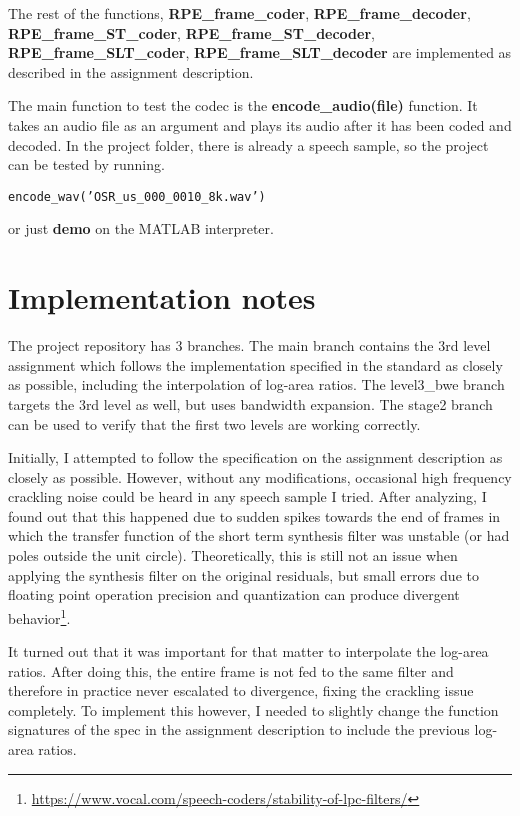 \documentclass[]{article}
\begin{document}
The rest of the functions, \textbf{RPE\_frame\_coder}, \textbf{RPE\_frame\_decoder}, \\ \textbf{RPE\_frame\_ST\_coder}, \textbf{RPE\_frame\_ST\_decoder}, \textbf{RPE\_frame\_SLT\_coder}, \textbf{RPE\_frame\_SLT\_decoder} are implemented as described in the assignment description.

The main function to test the codec is the \textbf{encode\_audio(file)} function. It takes an audio file as an argument and plays its audio after it has been coded and decoded. In the project folder, there is already a speech sample, so the project can be tested by running.

\begin{center}
	\texttt{encode\_wav('OSR\_us\_000\_0010\_8k.wav')}
\end{center}

\noindent or just \textbf{demo} on the MATLAB interpreter.

\section{Implementation notes}
The project repository has 3 branches. The main branch contains the 3rd level assignment which follows the implementation specified in the standard as closely as possible, including the interpolation of log-area ratios. The level3\_bwe branch targets the 3rd level as well, but uses bandwidth expansion. The stage2 branch can be used to verify that the first two levels are working correctly.

Initially, I attempted to follow the specification on the assignment description as closely as possible. However, without any modifications, occasional high frequency crackling noise could be heard in any speech sample I tried. After analyzing, I found out that this happened due to sudden spikes towards the end of frames in which the transfer function of the short term synthesis filter was unstable (or had poles outside the unit circle). Theoretically, this is still not an issue when applying the synthesis filter on the original residuals, but small errors due to floating point operation precision and quantization can produce divergent behavior\footnote{\url{https://www.vocal.com/speech-coders/stability-of-lpc-filters/}}.

It turned out that it was important for that matter to interpolate the log-area ratios. After doing this, the entire frame is not fed to the same filter and therefore in practice never escalated to divergence, fixing the crackling issue completely. To implement this however, I needed to slightly change the function signatures of the spec in the assignment description to include the previous log-area ratios.
\end{document}
